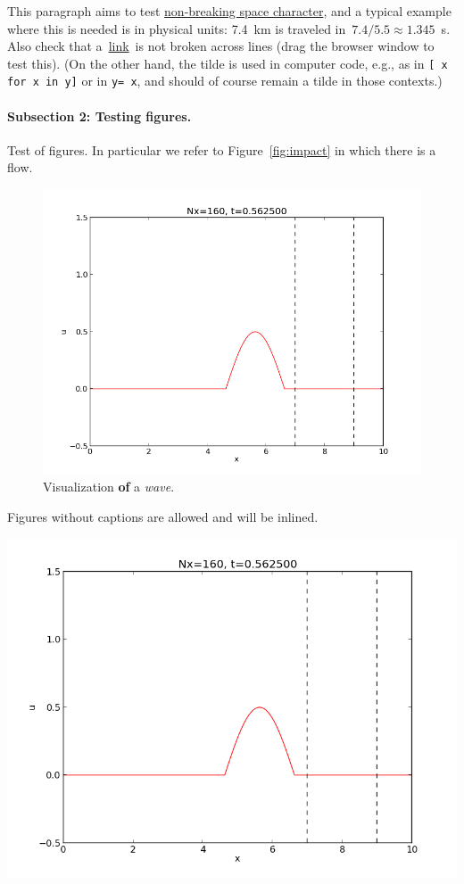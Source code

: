 \documentclass[%
oneside,                 %
final,                   %
10pt]{article}
\newenvironment{notice_mdfboxadmon}[1][]{
\begin{notice_mdfboxmdframed}[frametitle=#1]
}
{
\end{notice_mdfboxmdframed}
}
\theoremstyle{definition}
\begin{document}
\begin{enumerate}
\begin{notice_mdfboxadmon}
This paragraph aims to test \href{{https://en.wikipedia.org/wiki/Non-breaking_space}}{non-breaking space character}, and a typical
example where this is needed is in physical units: 7.4~km is traveled
in~$7.4/5.5\approx 1.345$~s.  Also check that a~\href{{https://google.com}}{link}~is
not broken across lines (drag the browser window to test this).
(On the other hand, the tilde is used in
computer code, e.g., as in \texttt{[~x for x in y]} or in \texttt{y=~x}, and should
of course remain a tilde in those contexts.)
\end{notice_mdfboxadmon} %


\paragraph{Subsection 2: Testing figures.}
\label{subsec:ex}
Test of figures. In particular we refer to Figure~\vref{fig:impact} in which
there is a flow.
\begin{figure}[!ht]  %
  \centerline{\includegraphics[width=0.9\linewidth]{testfigs/wave1D.png}}
  \caption{
  Visualization \textbf{of} a \emph{wave}. \label{fig:impact}
  }
\end{figure}
Figures without captions are allowed and will be inlined.
\vspace{6mm}
\centerline{\includegraphics[width=0.9\linewidth]{testfigs/wave1D.png}}

\end{enumerate}
\end{document}
